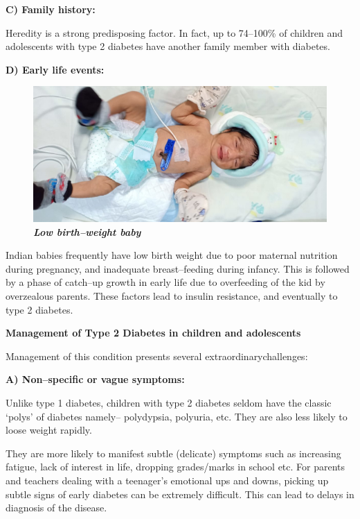 \noindent\textbf{C) Family history:}

Heredity is a strong predisposing factor. In fact, up to 74–100\% of children and adolescents with type 2 diabetes have another family member with diabetes.



\noindent\textbf{D) Early life events:}

\begin{figure}[h]
\centering
\includegraphics[scale=1.2]{images/025.jpg}\\
\small\textbf{\textit{Low birth–weight baby}}
\end{figure}

Indian babies frequently have low birth weight due to poor maternal nutrition during pregnancy, and inadequate breast–feeding during infancy. This is followed by a phase of catch–up growth in early life due to overfeeding of the kid by overzealous parents. These factors lead to insulin resi\-stance, and eventually to type 2 diabetes.

\noindent\textbf{Management of Type 2 Diabetes in children and adolescents}

Management of this condition presents several extraordinary\break challenges:

\noindent\textbf{A) Non–specific or vague symptoms:}

Unlike type 1 diabetes, children with type 2 diabetes seldom have the classic ‘polys’ of diabetes namely– polydypsia, polyuria, etc. They are also less likely to loose weight rapidly.

They are more likely to manifest subtle (delicate) symptoms such as increasing fatigue, lack of interest in life, dropping grades/marks in school etc. For parents and teachers dealing with a teenager’s emotional ups and downs, picking up subtle signs of early diabetes can be extremely difficult. This can lead to delays in diagnosis of the disease.

